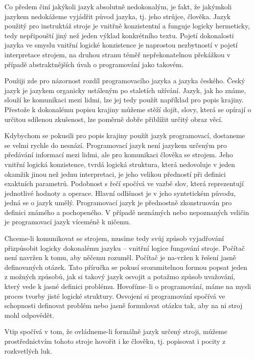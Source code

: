 \documentclass[10pt,twoside=true,open=right,cleardoublepage=empty,chapterprefix=true]{scrbook}
\newcommand{\lnb}{\linebreak}
\begin{document}
Co předem činí jakýkoli jazyk absolutně nedokonalým, je fakt, že jakýmkoli jazykem nedokážeme vyjádřit původ jazyka, tj. jeho strůjce, člověka. Jazyk použitý pro instruktáž stroje je vnitřně konzistentní a funguje logicky hermeticky, tedy nepřipouští jiný než jeden výklad konkrétního textu. Pojetí dokonalosti jazyka ve smyslu vnitřní logické konzistence je naprostou nezbytností v pojetí interpretace strojem, na druhou stranu téměř nepřekonatelnou překážkou v případě abstraktnějších úvah o programování jako takovém.

Použiji zde pro názornost rozdíl programovacího jazyka a jazyka českého. Český jazyk je jazykem organicky ustáleným po staletích užívání. Jazyk, jak ho známe, slouží ke komunikaci mezi lidmi, lze jej tedy použít například pro popis krajiny. Přestože k dokonalému popisu krajiny můžeme stěží dojít, slovy, která se opírají o určitou sdílenou zkušenost, lze poměrně dobře přiblížit určitý obraz věcí.

Kdybychom se pokusili pro popis krajiny použít jazyk programovací, dostaneme se velmi rychle do nesnází. Programovací jazyk není jazykem určeným pro předávání informací mezi lidmi, ale pro komunikaci člověka se strojem. Jeho vnitřní logická konzistence, tvrdá logická struktura, která nedovoluje v jeden okamžik jinou než jednu interpretaci, je jeho velikou předností při definici exaktních parametrů. Podobnost s řečí spočívá ve vazbě slov, která reprezentují jednotlivé hodnoty a operace. Hlavní odlišnost je v jeho syntetickém původu, jedná se o jazyk umělý. Programovací jazyk je přednostně zkonstruován pro definici známého a pochopeného. \lnb V případě neznámých nebo nepoznaných veličin je programovací jazyk víceméně k ničemu. 

Chceme-li komunikovat se strojem, musíme tedy svůj způsob vyjadřování přizpůsobit logicky dokonalému jazyku -- vnitřní logice fungování stroje. Počítač není navržen k tomu, aby něčemu rozuměl. Počítač je na-vržen k řešení jasně definovaných otázek. Tato příručka se pokusí srozumitelnou formou popsat jeden z možných způsobů, jak si takový jazyk osvojit a potažmo způsob uvažování, který vede k jasné definici problému. Hovoříme--li o programování, máme na mysli proces tvorby jisté logické struktury. Osvojení si programování spočívá ve schopnosti definovat problém nebo jasně formulovat otázku tak, aby na ni stroj mohl odpovědět.

Vtip spočívá v tom, že ovládneme-li formálně jazyk určený stroji, můžeme prostřednictvím tohoto stroje hovořit i ke člověku, tj. popisovat i pocity z rozkvetlých luk.
\end{document}
